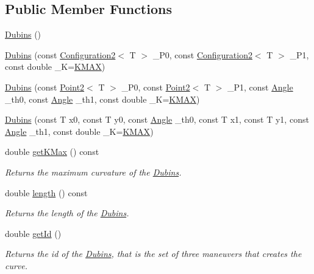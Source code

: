 \subsection*{Public Member Functions}
\begin{DoxyCompactItemize}
\item 
\mbox{\hyperlink{class_dubins_acc45a9db5f20150b58d4fc36ad1548fa}{Dubins}} ()
\item 
\mbox{\hyperlink{class_dubins_aa967d7d3009612ab99ac0b8e7ec33c83}{Dubins}} (const \mbox{\hyperlink{class_configuration2}{Configuration2}}$<$ T $>$ \+\_\+\+P0, const \mbox{\hyperlink{class_configuration2}{Configuration2}}$<$ T $>$ \+\_\+\+P1, const double \+\_\+K=\mbox{\hyperlink{dubins_8hh_a940b85a83458e94519f2685b33ddd276}{K\+M\+AX}})
\item 
\mbox{\hyperlink{class_dubins_a6120f64c71b7a37bc1051f9f87c02e9e}{Dubins}} (const \mbox{\hyperlink{class_point2}{Point2}}$<$ T $>$ \+\_\+\+P0, const \mbox{\hyperlink{class_point2}{Point2}}$<$ T $>$ \+\_\+\+P1, const \mbox{\hyperlink{class_angle}{Angle}} \+\_\+th0, const \mbox{\hyperlink{class_angle}{Angle}} \+\_\+th1, const double \+\_\+K=\mbox{\hyperlink{dubins_8hh_a940b85a83458e94519f2685b33ddd276}{K\+M\+AX}})
\item 
\mbox{\hyperlink{class_dubins_a8f2efa271286dda2c669988b600ac858}{Dubins}} (const T x0, const T y0, const \mbox{\hyperlink{class_angle}{Angle}} \+\_\+th0, const T x1, const T y1, const \mbox{\hyperlink{class_angle}{Angle}} \+\_\+th1, const double \+\_\+K=\mbox{\hyperlink{dubins_8hh_a940b85a83458e94519f2685b33ddd276}{K\+M\+AX}})
\item 
double \mbox{\hyperlink{class_dubins_a5e9a9f09ceed8f592fd35d078090854e}{get\+K\+Max}} () const
\begin{DoxyCompactList}\small\item\em Returns the maximum curvature of the \mbox{\hyperlink{class_dubins}{Dubins}}. \end{DoxyCompactList}\item 
double \mbox{\hyperlink{class_dubins_ae4978fe0667d364224c0a7521903a225}{length}} () const
\begin{DoxyCompactList}\small\item\em Returns the length of the \mbox{\hyperlink{class_dubins}{Dubins}}. \end{DoxyCompactList}\item 
double \mbox{\hyperlink{class_dubins_a5781212ce32e684018104d2c0676ceb6}{get\+Id}} ()
\begin{DoxyCompactList}\small\item\em Returns the id of the \mbox{\hyperlink{class_dubins}{Dubins}}, that is the set of three maneuvers that creates the curve. \end{DoxyCompactList}\item 

\end{DoxyCompactItemize}
